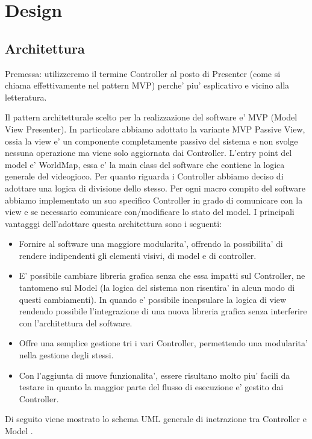 \documentclass[a4paper,12pt]{report}
\begin{document}
\chapter{Design}

\section{Architettura}
Premessa: utilizzeremo il termine Controller al posto di Presenter (come si chiama effettivamente nel pattern MVP) perche' piu' esplicativo e vicino alla letteratura.

Il pattern architetturale scelto per la realizzazione del software e' MVP (Model View Presenter). In particolare abbiamo adottato la variante MVP Passive View, ossia la view e' un componente completamente passivo del sistema e non svolge nessuna operazione ma viene solo aggiornata dai Controller.
L'entry point del model e' WorldMap, essa e' la main class del software che contiene la logica generale del videogioco. Per quanto riguarda i Controller abbiamo deciso di adottare una logica di divisione dello stesso. Per ogni macro compito del software abbiamo implementato un suo specifico Controller in grado di comunicare con la view e se necessario comunicare con/modificare lo stato del model.
I principali vantagggi dell'adottare questa architettura sono i seguenti:
\begin{itemize}
	\item Fornire al software una maggiore modularita', offrendo la possibilita' di rendere indipendenti gli elementi visivi, di model e di controller. 
    \item E' possibile cambiare libreria grafica senza che essa impatti sul Controller, ne tantomeno sul Model (la logica del sistema non risentira' in alcun modo di questi cambiamenti). In quando e' possibile incapsulare la logica di view rendendo possibile l'integrazione di una nuova libreria grafica senza interferire con l'architettura del software.
    \item Offre una semplice gestione tri i vari Controller, permettendo una modularita' nella gestione degli stessi.
    \item Con l'aggiunta di nuove funzionalita', essere risultano molto piu' facili da testare in quanto la maggior parte del flusso di esecuzione e' gestito dai Controller.
\end{itemize}
Di seguito viene mostrato lo schema UML generale di inetrazione tra Controller e Model .
\end{document}
